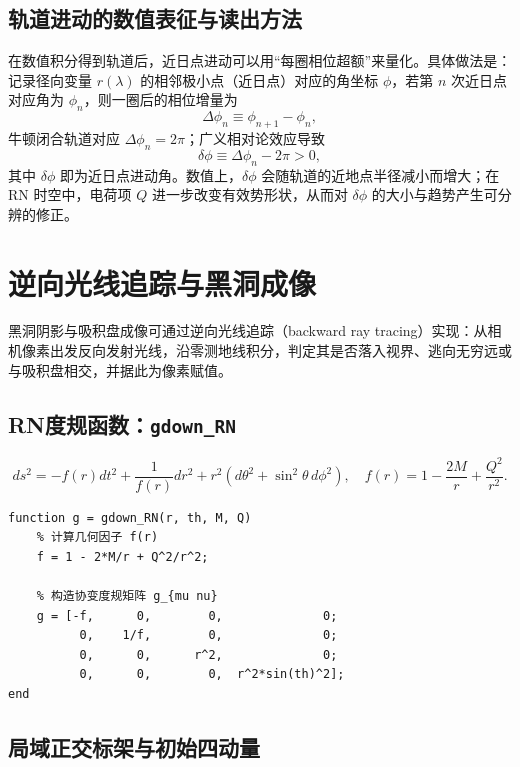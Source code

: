\documentclass[a4paper,12pt]{article}
\begin{document}
\subsection{轨道进动的数值表征与读出方法}

在数值积分得到轨道后，近日点进动可以用“每圈相位超额”来量化。具体做法是：记录径向变量 $r(\lambda)$ 的相邻极小点（近日点）对应的角坐标 $\phi$，若第 $n$ 次近日点对应角为 $\phi_n$，则一圈后的相位增量为
\begin{equation}
\Delta\phi_n \equiv \phi_{n+1}-\phi_n,
\end{equation}
牛顿闭合轨道对应 $\Delta\phi_n=2\pi$；广义相对论效应导致
\begin{equation}
\delta\phi \equiv \Delta\phi_n-2\pi > 0,
\end{equation}
其中 $\delta\phi$ 即为近日点进动角。数值上，$\delta\phi$ 会随轨道的近地点半径减小而增大；在 RN 时空中，电荷项 $Q$ 进一步改变有效势形状，从而对 $\delta\phi$ 的大小与趋势产生可分辨的修正。



\section{逆向光线追踪与黑洞成像}

黑洞阴影与吸积盘成像可通过逆向光线追踪（backward ray tracing）实现：从相机像素出发反向发射光线，沿零测地线积分，判定其是否落入视界、逃向无穷远或与吸积盘相交，并据此为像素赋值。

\subsection{RN度规函数：\texttt{gdown\_RN}}

\begin{equation}
ds^2=-f(r)dt^2+\frac{1}{f(r)}dr^2+r^2(d\theta^2+\sin^2\theta\,d\phi^2),
\quad
f(r)=1-\frac{2M}{r}+\frac{Q^2}{r^2}.
\end{equation}

\begin{lstlisting}[caption={协变度规函数 \texttt{gdown\_RN}}]
function g = gdown_RN(r, th, M, Q)
    % 计算几何因子 f(r)
    f = 1 - 2*M/r + Q^2/r^2;

    % 构造协变度规矩阵 g_{mu nu}
    g = [-f,      0,        0,              0;
          0,    1/f,        0,              0;
          0,      0,      r^2,              0;
          0,      0,        0,  r^2*sin(th)^2];
end
\end{lstlisting}

\subsection{局域正交标架与初始四动量}
\end{document}
